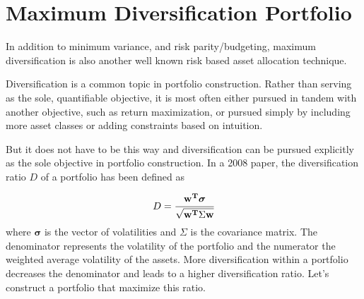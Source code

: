 \section{Maximum Diversification Portfolio}
\label{maximum-diversification-portfolio}

In addition to minimum variance, and risk parity/budgeting, maximum diversification is also another well known risk based asset allocation technique.

Diversification is a common topic in portfolio construction. Rather than serving as the sole, quantifiable objective, it is most often either pursued in tandem with another objective, such as return maximization, or pursued simply by including more asset classes or adding constraints based on intuition.

But it does not have to be this way and diversification can be pursued explicitly as the sole objective in portfolio construction.
In a 2008 paper, the diversification ratio $D$ of a portfolio has been defined as

\[
D=\cfrac{\mathbf{w^T}\boldsymbol{\sigma}}{\sqrt {\mathbf{w^T}\Sigma \mathbf{w}}} 
\]
where $\boldsymbol{\sigma}$ is the vector of volatilities and $\Sigma$ is the covariance matrix. The denominator represents the volatility of the portfolio and the numerator the weighted average volatility of the assets. More diversification within a portfolio decreases the denominator and leads to a higher diversification ratio.
Let's construct a portfolio that maximize this ratio.

